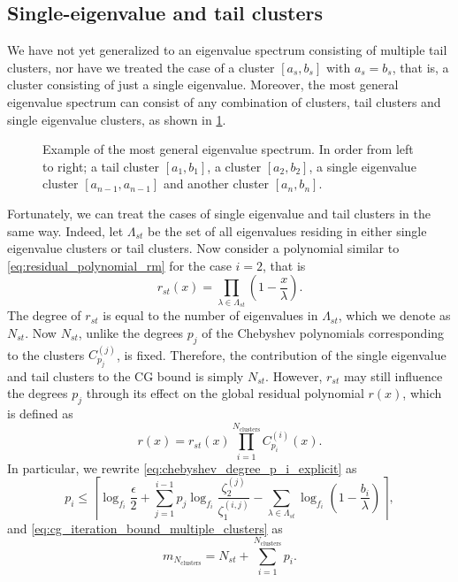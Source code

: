\subsection{Single-eigenvalue and tail clusters}\label{sec:cg_single_eigenvalue_tail_clusters}
We have not yet generalized to an eigenvalue spectrum consisting of multiple tail clusters, nor have we treated the case of a cluster $[a_s, b_s]$ with $a_s=b_s$, that is, a cluster consisting of just a single eigenvalue. Moreover, the most general eigenvalue spectrum can consist of any combination of clusters, tail clusters and single eigenvalue clusters, as shown in \cref{fig:general_spectrum}.
\begin{figure}[H]
    \centering
    
    \caption{Example of the most general eigenvalue spectrum. In order from left to right; a tail cluster $[a_1, b_1]$, a cluster $[a_2, b_2]$, a single eigenvalue cluster $[a_{n-1}, a_{n-1}]$ and another cluster $[a_n, b_n]$.}
    \label{fig:general_spectrum}
\end{figure}

Fortunately, we can treat the cases of single eigenvalue and tail clusters in the same way. Indeed, let $\Lambda_{st}$ be the set of all eigenvalues residing in either single eigenvalue clusters or tail clusters. Now consider a polynomial similar to \cref{eq:residual_polynomial_rm} for the case $i=2$, that is
\begin{equation}
    r_{st}(x) = \prod_{\lambda\in\Lambda_{st}} \left(1 - \frac{x}{\lambda}\right).
\end{equation}
The degree of $r_{st}$ is equal to the number of eigenvalues in $\Lambda_{st}$, which we denote as $N_{st}$. Now $N_{st}$, unlike the degrees $p_j$ of the Chebyshev polynomials corresponding to the clusters $C^{(j)}_{p_j}$, is fixed. Therefore, the contribution of the single eigenvalue and tail clusters to the CG bound is simply $N_{st}$. However, $r_{st}$ may still influence the degrees $p_j$ through its effect on the global residual polynomial $r(x)$, which is defined as
\begin{equation}
    r(x) = r_{st}(x) \prod_{i=1}^{N_{\text{clusters}}} C^{(i)}_{p_i}(x).
    \label{eq:general_residual_polynomial}
\end{equation}
In particular, we rewrite \cref{eq:chebyshev_degree_p_i_explicit} as
\begin{equation}
    p_i \leq \left\lceil\log_{f_i}{\frac{\epsilon}{2}} + \sum_{j=1}^{i-1} p_j\log_{f_i}{\frac{\zeta^{(j)}_2}{\zeta^{(i,j)}_1}} - \sum_{\lambda\in\Lambda_{st}}
    \log_{f_i}\left(1-\frac{b_i}{\lambda}\right)\right\rceil,
\end{equation}
and \cref{eq:cg_iteration_bound_multiple_clusters} as
\begin{equation}
    m_{N_{\text{clusters}}} = N_{st} + \sum_{i=1}^{N_{\text{clusters}}} p_i.
    \label{eq:cg_iteration_bound_multiple_clusters_s}
\end{equation}

